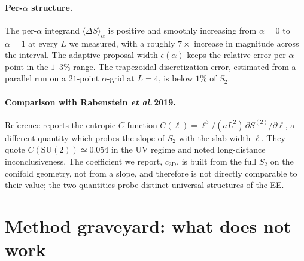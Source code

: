 \documentclass[aps,prl,reprint,superscriptaddress,floatfix,nofootinbib,amssymb]{revtex4-2}
\newcommand{\SUtwo}{\mathrm{SU}(2)}
\begin{document}
\paragraph{Per-$\alpha$ structure.}
The per-$\alpha$ integrand $\langle \Delta S\rangle_\alpha$ is positive and smoothly increasing from $\alpha=0$ to $\alpha=1$ at every $L$ we measured, with a roughly $7\times$ increase in magnitude across the interval. The adaptive proposal width $\epsilon(\alpha)$ keeps the relative error per $\alpha$-point in the $1\text{--}3\%$ range. The trapezoidal discretization error, estimated from a parallel run on a $21$-point $\alpha$-grid at $L=4$, is below $1\%$ of $S_2$.

\paragraph{Comparison with Rabenstein \emph{et al.}\,2019.}
Reference \cite{Rabenstein2019} reports the entropic $C$-function $C(\ell) = \ell^3/(a L^2)\,\partial S^{(2)}/\partial\ell$, a different quantity which probes the slope of $S_2$ with the slab width $\ell$. They quote $C(\SUtwo)\simeq 0.054$ in the UV regime and noted long-distance inconclusiveness. The coefficient we report, $c_{3\text{D}}$, is built from the full $S_2$ on the conifold geometry, not from a slope, and therefore is not directly comparable to their value; the two quantities probe distinct universal structures of the EE.

\section{Method graveyard: what does not work}
\label{sec:graveyard}
\end{document}
